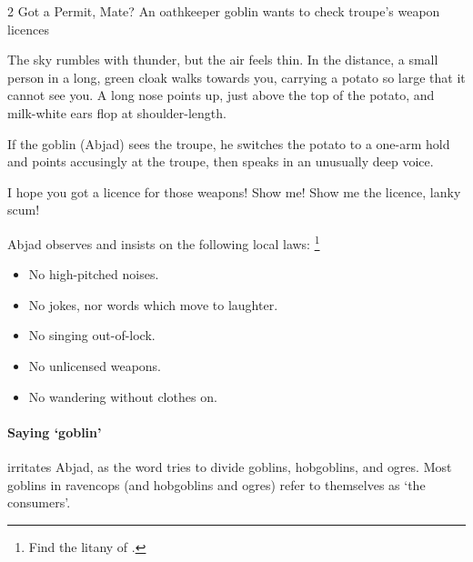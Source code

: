 \begin{multicols}{2}
{Got a Permit, Mate?}%
{An oathkeeper goblin wants to check troupe's weapon licences}%

\begin{boxtext}[]
  The sky rumbles with thunder, but the air feels thin.
  In the distance, a small person in a long, green cloak walks towards you, carrying a potato so large that it cannot see you.
  A long nose points up, just above the top of the potato, and milk-white ears flop at shoulder-length.
\end{boxtext}


If the goblin (Abjad) sees the troupe, he switches the potato to a one-arm hold and points accusingly at the troupe, then speaks in an unusually deep voice.

\null
\begin{speechtext}
  I hope you got a licence for those weapons!
  Show me!
  Show me the licence, lanky scum!
\end{speechtext}

Abjad observes and insists on the following local laws:
\footnote{Find the litany of  .}

\begin{itemize}
  \item
  No high-pitched noises.
  \item
  No jokes, nor words which move to laughter.
  \item
  No singing out-of-lock.
  \item
  No unlicensed weapons.
  \item
  No wandering without clothes on.
\end{itemize}


\paragraph{Saying `goblin'}
irritates Abjad, as the word tries to divide goblins, hobgoblins, and \glspl{ogre}.
Most goblins in \gls{ravencops} (and hobgoblins and \glspl{ogre}) refer to themselves as `the \glspl{consumer}'.


\end{multicols}
